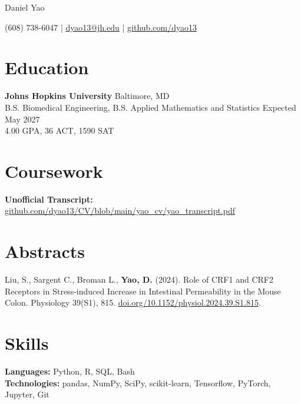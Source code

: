 \documentclass[11pt]{article}       %
\begin{document}
\centerline{\Huge Daniel Yao}

\vspace{5pt}

\centerline{(608) 738-6047 | \href{mailto:dyao13@jh.edu}{dyao13@jh.edu} | \href{https://github.com/dyao13/}{github.com/dyao13}}

\vspace{-9pt}

\section*{Education}

\textbf{Johns Hopkins University} \hfill Baltimore, MD \\
B.S. Biomedical Engineering, B.S. Applied Mathematics and Statistics \hfill Expected May 2027 \\
4.00 GPA, 36 ACT, 1590 SAT

\vspace{-9pt}

\section*{Coursework}

\textbf{Unofficial Transcript:} \href{https://github.com/dyao13/CV/blob/main/yao_cv/yao_transcript.pdf}{github.com/dyao13/CV/blob/main/yao\_cv/yao\_transcript.pdf}

\vspace{-9pt}

\section*{Abstracts}

Liu, S., Sargent C., Broman L., \textbf{Yao, D.} (2024). Role of CRF1 and CRF2 Receptors in Stress-induced Increase in Intestinal Permeability in the Mouse Colon. Physiology 39(S1), 815. \href{https://doi.org/10.1152/physiol.2024.39.S1.815}{doi.org/10.1152/physiol.2024.39.S1.815}.

\vspace{-9pt}

\section*{Skills}
\textbf{Languages:} Python, R, SQL, Bash \\
\textbf{Technologies:} pandas, NumPy, SciPy, scikit-learn, Tensorflow, PyTorch, Jupyter, Git
\end{document}
